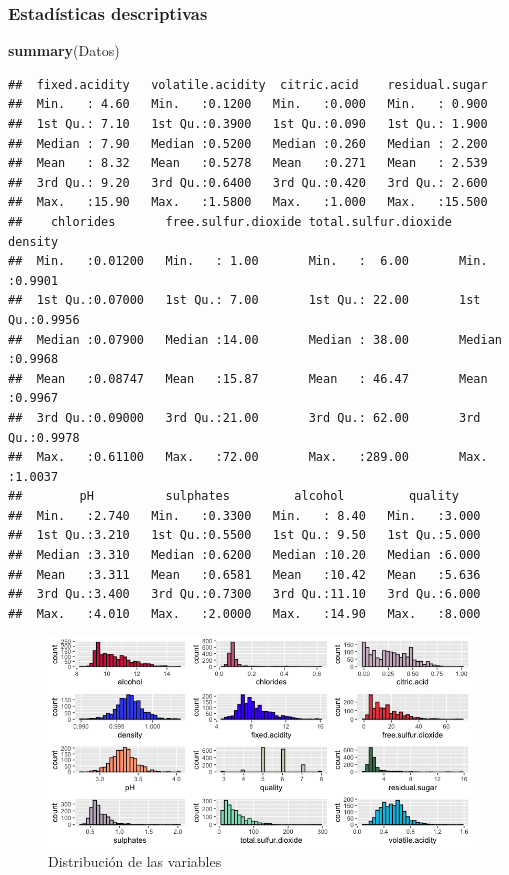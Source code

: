 \documentclass[
]{article}
\newenvironment{Shaded}{\begin{snugshade}}{\end{snugshade}}
\newcommand{\KeywordTok}[1]{\textcolor[rgb]{0.13,0.29,0.53}{\textbf{#1}}}
\newcommand{\NormalTok}[1]{#1}
\begin{document}
\hypertarget{estaduxedsticas-descriptivas}{%
\subsubsection{Estadísticas
descriptivas}\label{estaduxedsticas-descriptivas}}

\begin{Shaded}
\begin{Highlighting}[]
\KeywordTok{summary}\NormalTok{(Datos)}
\end{Highlighting}
\end{Shaded}

\begin{verbatim}
##  fixed.acidity   volatile.acidity  citric.acid    residual.sugar  
##  Min.   : 4.60   Min.   :0.1200   Min.   :0.000   Min.   : 0.900  
##  1st Qu.: 7.10   1st Qu.:0.3900   1st Qu.:0.090   1st Qu.: 1.900  
##  Median : 7.90   Median :0.5200   Median :0.260   Median : 2.200  
##  Mean   : 8.32   Mean   :0.5278   Mean   :0.271   Mean   : 2.539  
##  3rd Qu.: 9.20   3rd Qu.:0.6400   3rd Qu.:0.420   3rd Qu.: 2.600  
##  Max.   :15.90   Max.   :1.5800   Max.   :1.000   Max.   :15.500  
##    chlorides       free.sulfur.dioxide total.sulfur.dioxide    density      
##  Min.   :0.01200   Min.   : 1.00       Min.   :  6.00       Min.   :0.9901  
##  1st Qu.:0.07000   1st Qu.: 7.00       1st Qu.: 22.00       1st Qu.:0.9956  
##  Median :0.07900   Median :14.00       Median : 38.00       Median :0.9968  
##  Mean   :0.08747   Mean   :15.87       Mean   : 46.47       Mean   :0.9967  
##  3rd Qu.:0.09000   3rd Qu.:21.00       3rd Qu.: 62.00       3rd Qu.:0.9978  
##  Max.   :0.61100   Max.   :72.00       Max.   :289.00       Max.   :1.0037  
##        pH          sulphates         alcohol         quality     
##  Min.   :2.740   Min.   :0.3300   Min.   : 8.40   Min.   :3.000  
##  1st Qu.:3.210   1st Qu.:0.5500   1st Qu.: 9.50   1st Qu.:5.000  
##  Median :3.310   Median :0.6200   Median :10.20   Median :6.000  
##  Mean   :3.311   Mean   :0.6581   Mean   :10.42   Mean   :5.636  
##  3rd Qu.:3.400   3rd Qu.:0.7300   3rd Qu.:11.10   3rd Qu.:6.000  
##  Max.   :4.010   Max.   :2.0000   Max.   :14.90   Max.   :8.000
\end{verbatim}

\begin{figure}
\centering
\includegraphics[width=6.77083in,height=\textheight]{G1.png}
\caption{Distribución de las variables}
\end{figure}
\end{document}
